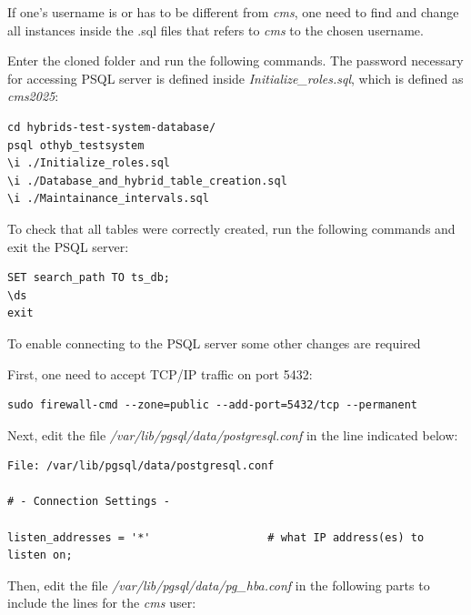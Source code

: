 \documentclass[10pt,a4paper]{article}
\begin{document}
If one's username is or has to be different from \textit{cms}, one need to find and change all instances inside the .sql files that refers to \textit{cms} to the chosen username.

Enter the cloned folder and run the following commands. The password necessary for accessing PSQL server is defined inside \emph{Initialize\_roles.sql}, which is defined as \textit{cms2025}:

\begin{framed}
\begin{verbatim}
cd hybrids-test-system-database/
psql othyb_testsystem 
\i ./Initialize_roles.sql 
\i ./Database_and_hybrid_table_creation.sql 
\i ./Maintainance_intervals.sql 
\end{verbatim}
\end{framed}

To check that all tables were correctly created, run the following commands and exit the PSQL server: 

\begin{framed}
\begin{verbatim}
SET search_path TO ts_db; 
\ds
exit
\end{verbatim}
\end{framed}

To enable connecting to the PSQL server some other changes are required 

First, one need to accept TCP/IP traffic on port 5432:

\begin{framed}
\begin{verbatim}
sudo firewall-cmd --zone=public --add-port=5432/tcp --permanent
\end{verbatim}
\end{framed}

Next, edit the file \emph{/var/lib/pgsql/data/postgresql.conf} in the line indicated below:

\begin{framed}
\begin{verbatim}
File: /var/lib/pgsql/data/postgresql.conf

# - Connection Settings -

listen_addresses = '*'                  # what IP address(es) to listen on;
\end{verbatim}
\end{framed}

Then, edit the file \emph{/var/lib/pgsql/data/pg\_hba.conf} in the following parts to include the lines for the \textit{cms} user:
\end{document}
